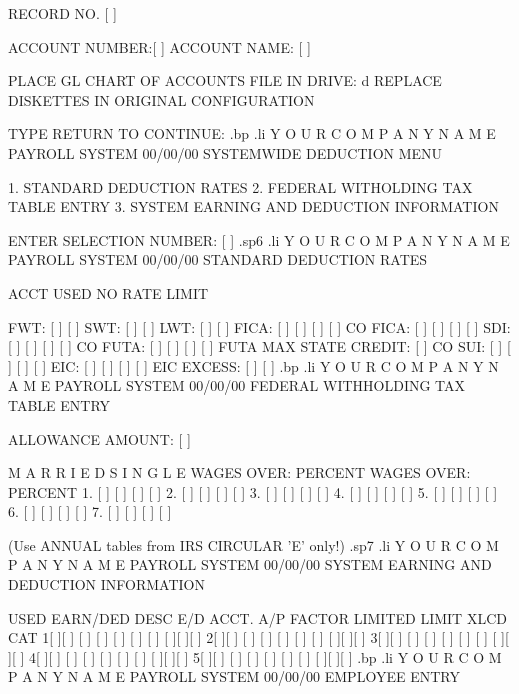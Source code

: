 	RECORD NO. [   ]

	   ACCOUNT NUMBER:[	 ]
	   ACCOUNT NAME:  [				 ]


	PLACE GL CHART OF ACCOUNTS FILE IN DRIVE: d
	REPLACE DISKETTES IN ORIGINAL CONFIGURATION

	TYPE RETURN TO CONTINUE:
.bp
.li
		      Y O U R	C O M P A N Y	 N A M E
			       PAYROLL SYSTEM
  00/00/00		   SYSTEMWIDE DEDUCTION MENU



		  1.  STANDARD DEDUCTION RATES
		  2.  FEDERAL WITHOLDING TAX TABLE ENTRY
		  3.  SYSTEM EARNING AND DEDUCTION INFORMATION



			   ENTER SELECTION NUMBER: [ ]
.sp6
.li
		  Y O U R    C O M P A N Y    N A M E
			     PAYROLL SYSTEM
  00/00/00		STANDARD DEDUCTION RATES

			      ACCT
		       USED    NO      RATE	LIMIT

	       FWT:	[ ]   [   ]
	       SWT:	[ ]   [   ]
	       LWT:	[ ]   [   ]
	       FICA:	[ ]   [   ]   [     ] [ 	  ]
	       CO FICA: [ ]   [   ]   [     ] [ 	  ]
	       SDI:	[ ]   [   ]   [     ] [ 	  ]
	       CO FUTA: [ ]   [   ]   [     ] [ 	  ]
	       FUTA MAX STATE CREDIT: [     ]
	       CO SUI:	[ ]   [   ]   [     ] [ 	  ]
	       EIC:	[ ]   [   ]   [     ] [ 	  ]
	       EIC EXCESS:	      [     ] [ 	  ]
.bp
.li
		       Y O U R	 C O M P A N Y	 N A M E
				PAYROLL SYSTEM
  00/00/00	      FEDERAL WITHHOLDING TAX TABLE ENTRY


		       ALLOWANCE AMOUNT:  [	      ]

		     M A R R I E D		  S I N G L E
		WAGES OVER:   PERCENT	   WAGES OVER:	 PERCENT
	   1.  [	   ]  [     ]	  [	      ]  [     ]
	   2.  [	   ]  [     ]	  [	      ]  [     ]
	   3.  [	   ]  [     ]	  [	      ]  [     ]
	   4.  [	   ]  [     ]	  [	      ]  [     ]
	   5.  [	   ]  [     ]	  [	      ]  [     ]
	   6.  [	   ]  [     ]	  [	      ]  [     ]
	   7.  [	   ]  [     ]	  [	      ]  [     ]

	       (Use ANNUAL tables from IRS CIRCULAR 'E' only!)
.sp7
.li
		    Y O U R    C O M P A N Y	N A M E
			      PAYROLL SYSTEM
  00/00/00	  SYSTEM EARNING AND DEDUCTION INFORMATION

USED  EARN/DED DESC   E/D ACCT. A/P   FACTOR   LIMITED	 LIMIT	  XLCD CAT
1[ ][		    ] [ ] [   ] [ ] [	       ] [ ] [		  ][ ][  ]
2[ ][		    ] [ ] [   ] [ ] [	       ] [ ] [		  ][ ][  ]
3[ ][		    ] [ ] [   ] [ ] [	       ] [ ] [		  ][ ][  ]
4[ ][		    ] [ ] [   ] [ ] [	       ] [ ] [		  ][ ][  ]
5[ ][		    ] [ ] [   ] [ ] [	       ] [ ] [		  ][ ][  ]
.bp
.li
		   Y O U R   C O M P A N Y   N A M E
			     PAYROLL SYSTEM
  00/00/00		     EMPLOYEE ENTRY

